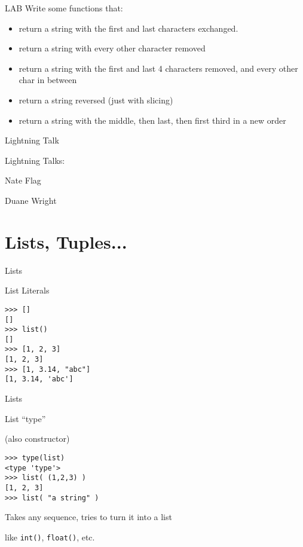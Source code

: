 \documentclass{beamer}
\begin{document}
\begin{frame}[fragile]{LAB}
Write some functions that:
\begin{itemize}
  \item return a string with the first and last characters exchanged.
  \item return a string with every other character removed
  \item return a string with the first and last 4 characters removed, and every other char in between
  \item return a string reversed (just with slicing)
  \item return a string with the middle, then last, then first third in a new order
\end{itemize}

\end{frame}

\begin{frame}{Lightning Talk}

{\LARGE Lightning Talks:}

\vfill
{\large Nate Flag}

\vfill
{\large Duane Wright}

\end{frame}


\section{Lists, Tuples...}

\begin{frame}[fragile]{Lists}

 {\Large List Literals}

\begin{verbatim}
>>> []
[]
>>> list()
[]
>>> [1, 2, 3]
[1, 2, 3]
>>> [1, 3.14, "abc"]
[1, 3.14, 'abc']
\end{verbatim}

\end{frame} 

\begin{frame}[fragile]{Lists}

 {\Large List ``type''}

 {\large \hspace{0.1in}(also constructor)}

\begin{verbatim}
>>> type(list)
<type 'type'>
>>> list( (1,2,3) )
[1, 2, 3]
>>> list( "a string" )
\end{verbatim}

\vfill
{\Large Takes any sequence, tries to turn it into a list}

\vfill
{\large like \verb|int()|, \verb|float()|, etc.}


\end{frame} 
\end{document}
